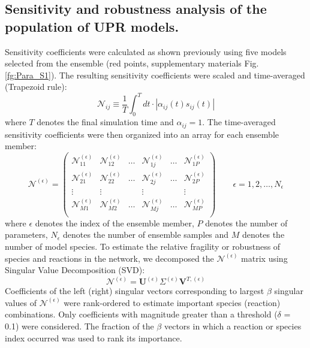\documentclass[fleqn,10pt]{wlscirep}
\begin{document}
\subsection*{Sensitivity and robustness analysis of the population of UPR models.}
Sensitivity coefficients were calculated as shown previously \cite{Song:2010ij} using five models selected from the ensemble (red points, supplementary materials Fig. \ref{fg:Para_S1}).
The resulting sensitivity coefficients were scaled and time-averaged (Trapezoid rule):
\begin{equation}\label{eqn_INsen}
	\mathcal{N}_{ij} \equiv \frac{1}{T}\int^{T}_{0} dt \cdot |\alpha_{ij}\left(t\right)s_{ij}(t)|
\end{equation}
where $T$ denotes the final simulation time and $\alpha_{ij}=1$.
The time-averaged sensitivity coefficients were then organized into an array for each ensemble member:
\begin{equation}
	\mathcal{N}^{\left(\epsilon\right)} =
	\begin{pmatrix}
		\mathcal{N}_{11}^{\left(\epsilon\right)} & \mathcal{N}_{12}^{\left(\epsilon\right)} & \hdots & \mathcal{N}_{1j}^{\left(\epsilon\right)} & \hdots & \mathcal{N}_{1P}^{\left(\epsilon\right)} \\
		\mathcal{N}_{21}^{\left(\epsilon\right)} & \mathcal{N}_{22}^{\left(\epsilon\right)} & \hdots & \mathcal{N}_{2j}^{\left(\epsilon\right)} & \hdots & \mathcal{N}_{2P}^{\left(\epsilon\right)} \\
		\vdots & \vdots & & \vdots & & \vdots \\
		\mathcal{N}_{M1}^{\left(\epsilon\right)} & \mathcal{N}_{M2}^{\left(\epsilon\right)} & \hdots & \mathcal{N}_{Mj}^{\left(\epsilon\right)} & \hdots & \mathcal{N}_{MP}^{\left(\epsilon\right)} \\
	\end{pmatrix}\qquad\epsilon = 1,2,\hdots,N_{\epsilon}
\end{equation}
where $\epsilon$ denotes the index of the ensemble member, $P$ denotes the number of parameters, $N_{\epsilon}$ denotes the number of ensemble samples and $M$ denotes the number of model species.
To estimate the relative fragility or robustness of species and reactions in the network, we decomposed the $\mathcal{N}^{\left(\epsilon\right)}$ matrix
using Singular Value Decomposition (SVD):
\begin{equation}
	\mathcal{N}^{\left(\epsilon\right)} = \mathbf{U}^{\left(\epsilon\right)}\Sigma^{\left(\epsilon\right)}\mathbf{V}^{T,{\left(\epsilon\right)}}
\end{equation}
Coefficients of the left (right) singular vectors corresponding to largest $\beta$ singular values of $\mathcal{N}^{\left(\epsilon\right)}$
were rank-ordered to estimate important species (reaction) combinations. Only coefficients with magnitude greater than a threshold ($\delta$ = 0.1) were considered.
The fraction of the $\beta$ vectors in which a reaction or species index occurred was used to rank its importance.
\end{document}
